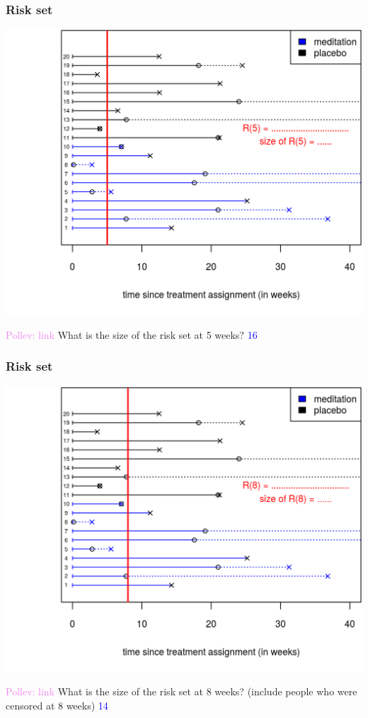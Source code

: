 \documentclass[10pt,t]{beamer}
\begin{document}
\begin{frame}
\frametitle{Risk set}
\begin{center}
\includegraphics[height=0.8\textheight]{figs/risk_set_movie_2.png}
\end{center}

\textcolor{violet}{Pollev: link} What is the size of the risk set at 5 weeks? \pause\textcolor{blue}{16}


\end{frame}

\begin{frame}
\frametitle{Risk set}
\begin{center}
\includegraphics[height=0.8\textheight]{figs/risk_set_movie_3.png}
\end{center}

\textcolor{violet}{Pollev: link} What is the size of the risk set at 8 weeks? (include people who were censored at 8 weeks) \pause\textcolor{blue}{14}



\end{frame}
\end{document}
